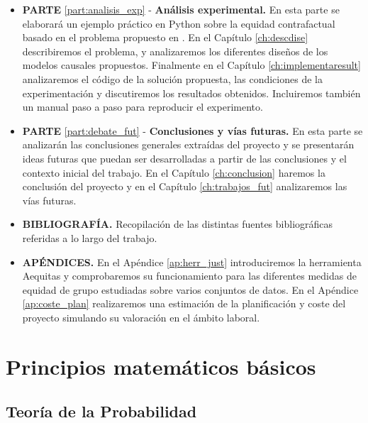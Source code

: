 \documentclass[oneside,openright,titlepage,numbers=noenddot,openany,headinclude,footinclude=true,
cleardoublepage=empty,abstractoff,BCOR=5mm,paper=a4,fontsize=12pt,main=spanish]{scrreprt}
\begin{document}
\begin{itemize}
    \item \textbf{PARTE} \ref{part:analisis_exp} - \textbf{Análisis experimental.} En esta parte se elaborará un ejemplo práctico en Python sobre la equidad contrafactual basado en el problema propuesto en \cite{counterfactual2018}. En el Capítulo \ref{ch:descdise} describiremos el problema, y analizaremos los diferentes diseños de los modelos causales propuestos. Finalmente en el Capítulo \ref{ch:implementaresult} analizaremos el código de la solución propuesta, las condiciones de la experimentación y discutiremos los resultados obtenidos. Incluiremos también un manual paso a paso para reproducir el experimento.\\
    \item \textbf{PARTE} \ref{part:debate_fut} - \textbf{Conclusiones y vías futuras.} En esta parte se analizarán las conclusiones generales extraídas del proyecto y se presentarán ideas futuras que puedan ser desarrolladas a partir de las conclusiones y el contexto inicial del trabajo. En el Capítulo \ref{ch:conclusion} haremos la conclusión del proyecto y en el Capítulo \ref{ch:trabajos_fut} analizaremos las vías futuras.\\
    \item \textbf{BIBLIOGRAFÍA.} Recopilación de las distintas fuentes bibliográficas referidas a lo largo del trabajo.\\
    \item \textbf{APÉNDICES.} En el Apéndice \ref{ap:herr_just} introduciremos la herramienta Aequitas y comprobaremos su funcionamiento para las diferentes medidas de equidad de grupo estudiadas sobre varios conjuntos de datos. En el Apéndice \ref{ap:coste_plan} realizaremos una estimación de la planificación y coste del proyecto simulando su valoración en el ámbito laboral.
\end{itemize}

\part{Principios matemáticos básicos} \label{part:princbasic}

\chapter{Teoría de la Probabilidad} \label{ch:teoriaprob}
\end{document}
